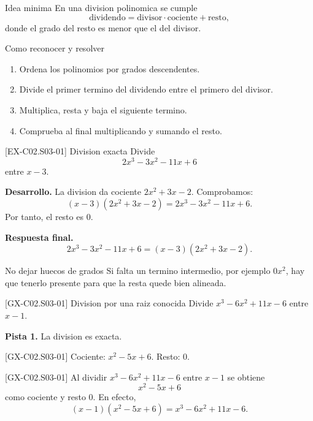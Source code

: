 \begin{theorybox}{Idea minima}
En una division polinomica se cumple
\[
\text{dividendo}=\text{divisor}\cdot \text{cociente}+\text{resto},
\]
donde el grado del resto es menor que el del divisor.
\end{theorybox}

\begin{methodbox}{Como reconocer y resolver}
\begin{enumerate}
  \item Ordena los polinomios por grados descendentes.
  \item Divide el primer termino del dividendo entre el primero del divisor.
  \item Multiplica, resta y baja el siguiente termino.
  \item Comprueba al final multiplicando y sumando el resto.
\end{enumerate}
\end{methodbox}

\begin{solvedexample}{[EX-C02.S03-01] Division exacta}
Divide
\[
2x^3-3x^2-11x+6
\]
entre \(x-3\).

\textbf{Desarrollo.} La division da cociente \(2x^2+3x-2\). Comprobamos:
\[
(x-3)(2x^2+3x-2)=2x^3-3x^2-11x+6.
\]
Por tanto, el resto es \(0\).

\textbf{Respuesta final.}
\[
2x^3-3x^2-11x+6=(x-3)(2x^2+3x-2).
\]
\end{solvedexample}

\begin{commonerror}{No dejar huecos de grados}
Si falta un termino intermedio, por ejemplo \(0x^2\), hay que tenerlo presente para que la
resta quede bien alineada.
\end{commonerror}

\begin{guidedexercise}{[GX-C02.S03-01] Division por una raiz conocida}
Divide \(x^3-6x^2+11x-6\) entre \(x-1\).

\textbf{Pista 1.} La division es exacta.
\end{guidedexercise}

\begin{shortanswer}{[GX-C02.S03-01]}
Cociente: \(x^2-5x+6\). Resto: \(0\).
\end{shortanswer}

\begin{fullsolution}{[GX-C02.S03-01]}
Al dividir \(x^3-6x^2+11x-6\) entre \(x-1\) se obtiene
\[
x^2-5x+6
\]
como cociente y resto \(0\). En efecto,
\[
(x-1)(x^2-5x+6)=x^3-6x^2+11x-6.
\]
\end{fullsolution}

